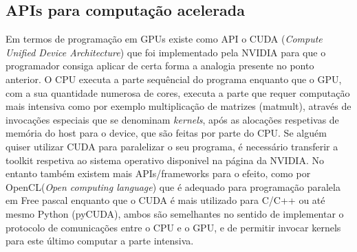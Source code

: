 \subsection{APIs para computação acelerada}
\label {cuda}
Em termos de programação em GPUs existe como API o CUDA (\textit{Compute Unified Device Architecture}) que foi implementado pela NVIDIA para que o programador consiga aplicar de certa forma a analogia presente no ponto anterior. O CPU executa a parte sequêncial do programa enquanto que o GPU, com a sua quantidade numerosa de cores, executa a parte que requer computação mais intensiva como por exemplo multiplicação de matrizes (matmult), através de invocações especiais que se denominam\textit{ kernels}, após as alocações respetivas de memória do host para o device, que são feitas por parte do CPU. Se alguém quiser utilizar CUDA para paralelizar o seu programa, é necessário transferir a toolkit respetiva ao sistema operativo disponivel na página da NVIDIA.
No entanto também existem mais APIs/frameworks para o efeito, como por OpenCL(\textit{Open computing language}) que é adequado para programação paralela em Free pascal enquanto que o CUDA é mais utilizado para C/C++ ou até mesmo Python (pyCUDA), ambos são semelhantes no sentido de implementar o protocolo de comunicações entre o CPU e o GPU, e de permitir invocar kernels para este último computar a parte intensiva.



